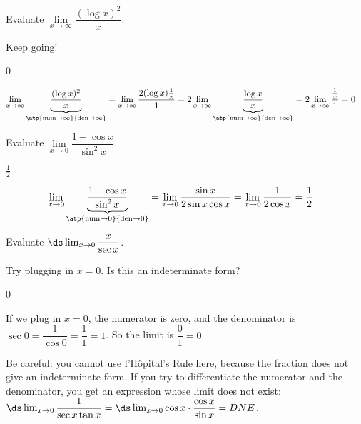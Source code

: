\begin{question}[1997A]
Evaluate $\lim\limits_{x\rightarrow\infty}\dfrac{(\log x)^2}{x}$.
\end{question}
\begin{hint} Keep going!
\end{hint}
\begin{answer} 0
\end{answer}
\begin{solution}
\begin{align*}\lim_{x\rightarrow\infty}\underbrace{\frac{(\log x)^2}{x}}_{\atp
	{\mathrm{num}\to\infty}
	{\mathrm{den}\to\infty}}
&=\lim_{x\rightarrow\infty}\frac{2(\log x)\frac{1}{x}}{1}
=2\lim_{x\rightarrow\infty}\underbrace{\frac{\log x}{x}}_{\atp
	{\mathrm{num}\to\infty}
	{\mathrm{den}\to\infty}}
= 2\lim_{x\rightarrow\infty}\frac{\frac{1}{x}}{1}={0}
\end{align*}
\end{solution}


\begin{question}[1997A]
Evaluate $\lim\limits_{x\rightarrow0}\dfrac{1-\cos x}{\sin^2 x}$.
\end{question}
\begin{answer} $\frac{1}{2}$
\end{answer}
\begin{solution}
\begin{align*}
\lim_{x\rightarrow0}\underbrace{\frac{1-\cos x}{\sin^2 x}}_{\atp
	{\mathrm{num}\to0}
	{\mathrm{den}\to0}}
&= \lim_{x\rightarrow0}\frac{\sin x}{2\sin x\cos x}
=\lim_{x\rightarrow0}\frac{1}{2\cos x}
={\frac{1}{2}}
\end{align*}
\end{solution}




\begin{question}
Evaluate $\ds\lim_{x \to 0}\dfrac{x}{\sec x}$.
\end{question}
\begin{hint}
Try plugging in $x=0$. Is this an indeterminate form?
\end{hint}
\begin{answer} 0
\end{answer}
\begin{solution}
If we plug in $x=0$, the numerator is zero, and the denominator is \\
$\sec 0 = \dfrac{1}{\cos 0}=\dfrac{1}{1}=1$. So the limit is $\dfrac{0}{1}=0$.

\medskip
Be careful: you cannot use l'H\^opital's Rule here, because the fraction does not give an indeterminate form. If you try to differentiate the numerator and the denominator, you get an expression whose limit does not exist:\\
$\ds\lim_{x \to 0}\dfrac{1}{\sec x \tan x}=\ds\lim_{x \to 0}\cos x\cdot \dfrac{\cos x}{\sin x}=DNE$.
\end{solution}




